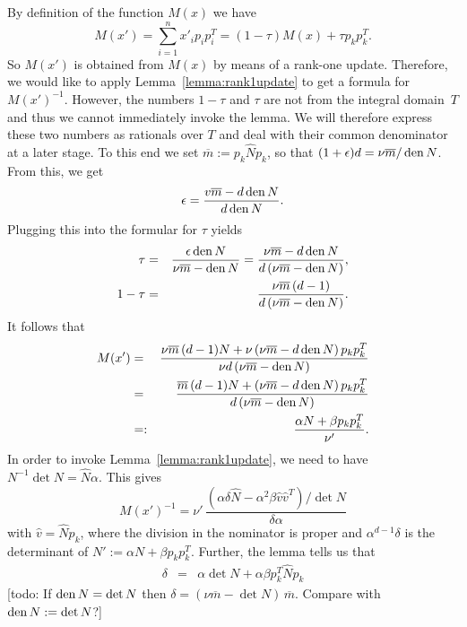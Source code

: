\documentclass[a4paper,twocolumn]{article}
\newcommand{\den}{\ensuremath{\mathop{\rm den}\nolimits}}
\newcommand{\ov}[1]{\overline{#1}}
\begin{document}
By definition of the function $M(x)$ we have
\[ 
M(x') = \sum_{i=1}^n x'_i p_ip_i^T = (1-\tau) M(x) + \tau p_kp_k^T.
\]
So $M(x')$ is obtained from $M(x)$ by means of a rank-one update.
Therefore, we would like to apply Lemma~\ref{lemma:rank1update} to get
a formula for $M(x')^{-1}$.  However, the numbers $1-\tau$ and $\tau$
are not from the integral domain~$T$ and thus we cannot immediately
invoke the lemma.  We will therefore express these two numbers as
rationals over $T$ and deal with their common denominator at a later
stage.  To this end we set $\ov{m}:= p_k \hat{N} p_k$, so that
$(1+\epsilon)d = \nu \ov{m}/\den{N}$.  From this, we get
\[
\epsilon = \frac{v\ov{m}-d\den{N}}{d \den{N}}.
\]
Plugging this into the formular for $\tau$ yields
\begin{eqnarray*}
  \tau   &=& \frac{\epsilon\den{N}}{\nu\ov{m} - \den{N}}
          =  \frac{\nu\ov{m}-d\den{N}}{d\,(\nu\ov{m} - \den{N})}, \\
  1-\tau &=& \frac{\nu\ov{m}\,(d-1)}{d\,(\nu\ov{m} - \den{N})}.
\end{eqnarray*}
It follows that
\begin{eqnarray*}
M(x') &=& \frac{\nu \ov{m}\,(d-1) N + \nu\,(\nu\ov{m}-d\den{N})\, p_kp_k^T}%
               {\nu d\,(\nu \ov{m}-\den{N})} \\
      &=& \frac{\ov{m}\,(d-1) N + (\nu\ov{m}-d\den{N})\, p_kp_k^T}%
               {d\,(\nu \ov{m}-\den{N})} \\
      &=:& \frac{\alpha N + \beta p_kp_k^T}{\nu'}.
\end{eqnarray*}
In order to invoke Lemma~\ref{lemma:rank1update}, we need to have
$N^{-1}\det{N} = \hat{N} \alpha$.  This gives
\[
M(x')^{-1} = \nu'\, \frac{(\alpha\delta\hat{N}-\alpha^2\beta
\hat{v}\hat{v}^T)/\det{N}}{\delta\alpha}
\]
with $\hat{v} = \hat{N}p_k$, where the division in the nominator is
proper and $\alpha^{d-1}\delta$ is the determinant of $N':= \alpha N + \beta
p_kp_k^T$.  Further, the lemma tells us that
\begin{eqnarray*}
\delta &=& \alpha \det{N} + \alpha\beta p_k^T\hat{N}p_k %
\end{eqnarray*}
[{\sc todo:} If $\den{N}=\det{N}$ then
$\delta=(\nu\ov{m}-\det{N})\,\ov{m}$.  Compare with $\den{N}:=
\det{N}$?]
\end{document}
